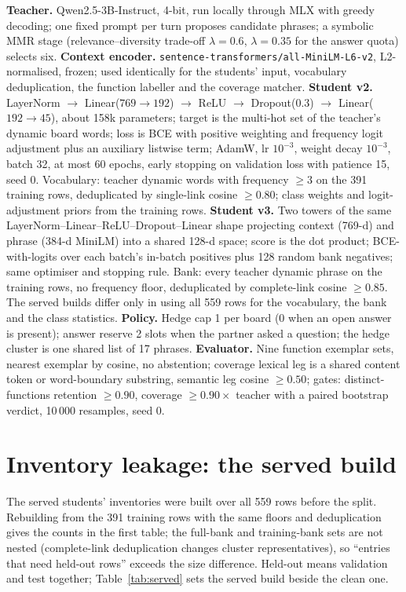 \textbf{Teacher.}
Qwen2.5-3B-Instruct, 4-bit, run locally through MLX with greedy decoding;
one fixed prompt per turn proposes candidate phrases; a symbolic MMR
stage (relevance--diversity trade-off $\lambda=0.6$, $\lambda=0.35$ for
the answer quota) selects six.
\textbf{Context encoder.}
\texttt{sentence-transformers/all-MiniLM-L6-v2}, L2-normalised, frozen;
used identically for the students' input, vocabulary deduplication, the
function labeller and the coverage matcher.
\textbf{Student v2.}
LayerNorm $\to$ Linear($769{\to}192$) $\to$ ReLU $\to$ Dropout(0.3)
$\to$ Linear($192{\to}45$), about 158k parameters; target is the multi-hot
set of the teacher's dynamic board words; loss is BCE with positive
weighting and frequency logit adjustment plus an auxiliary listwise term;
AdamW, lr $10^{-3}$, weight decay $10^{-3}$, batch 32, at most 60 epochs,
early stopping on validation loss with patience 15, seed 0.
Vocabulary: teacher dynamic words with frequency $\ge 3$ on the 391
training rows, deduplicated by single-link cosine $\ge 0.80$; class
weights and logit-adjustment priors from the training rows.
\textbf{Student v3.}
Two towers of the same LayerNorm--Linear--ReLU--Dropout--Linear shape
projecting context (769-d) and phrase (384-d MiniLM) into a shared 128-d
space; score is the dot product; BCE-with-logits over each batch's
in-batch positives plus 128 random bank negatives; same optimiser and
stopping rule. Bank: every teacher dynamic phrase on the training rows,
no frequency floor, deduplicated by complete-link cosine $\ge 0.85$.
The served builds differ only in using all 559 rows for the vocabulary,
the bank and the class statistics.
\textbf{Policy.}
Hedge cap 1 per board (0 when an open answer is present); answer reserve
2 slots when the partner asked a question; the hedge cluster is one
shared list of 17 phrases.
\textbf{Evaluator.}
Nine function exemplar sets, nearest exemplar by cosine, no abstention;
coverage lexical leg is a shared content token or word-boundary
substring, semantic leg cosine $\ge 0.50$; gates: distinct-functions
retention $\ge 0.90$, coverage $\ge 0.90\times$ teacher with a paired
bootstrap verdict, 10\,000 resamples, seed 0.

\section{Inventory leakage: the served build}
\label{app:prov}

The served students' inventories were built over all 559 rows before the
split. Rebuilding from the 391 training rows with the same floors and
deduplication gives the counts in the first table; the full-bank and
training-bank sets are not nested (complete-link deduplication changes
cluster representatives), so ``entries that need held-out rows'' exceeds
the size difference. Held-out means validation and test together;
Table~\ref{tab:served} sets the served build beside the clean one.

